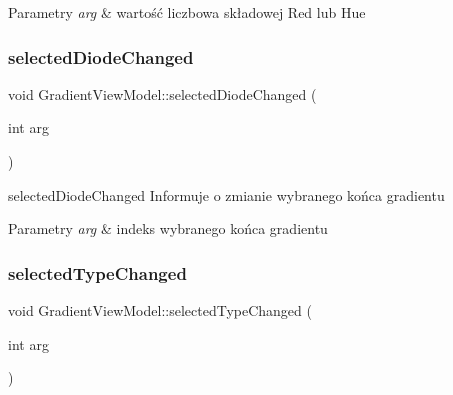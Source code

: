 \begin{DoxyParams}{Parametry}
{\em arg} & wartość liczbowa składowej Red lub Hue \\
\hline
\end{DoxyParams}
\mbox{\label{class_gradient_view_model_ad26d1979a011e1810e3e2e6c648b3882}} 
\subsubsection{\texorpdfstring{selected\+Diode\+Changed}{selectedDiodeChanged}}
{\footnotesize\ttfamily void Gradient\+View\+Model\+::selected\+Diode\+Changed (\begin{DoxyParamCaption}\item[{int}]{arg }\end{DoxyParamCaption})\hspace{0.3cm}{\ttfamily [signal]}}



selected\+Diode\+Changed Informuje o zmianie wybranego końca gradientu 


\begin{DoxyParams}{Parametry}
{\em arg} & indeks wybranego końca gradientu \\
\hline
\end{DoxyParams}
\mbox{\label{class_gradient_view_model_a5dbe7b881e5b4ef1ddbed14f0015a355}} 
\subsubsection{\texorpdfstring{selected\+Type\+Changed}{selectedTypeChanged}}
{\footnotesize\ttfamily void Gradient\+View\+Model\+::selected\+Type\+Changed (\begin{DoxyParamCaption}\item[{int}]{arg }\end{DoxyParamCaption})\hspace{0.3cm}{\ttfamily [signal]}}



